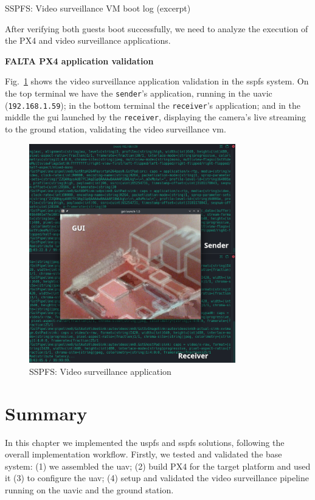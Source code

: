 \begin{longlisting}
\centering
\inputminted[]{kconfig}{./listing/sspfs-boot-cam.txt}
\caption{SSPFS: Video surveillance VM boot log (excerpt)}
\label{lst:sspfs-boot-cam}
\end{longlisting}

After verifying both guests boot successfully, we need to analyze the execution
of the PX4 and video surveillance applications.

\textbf{FALTA PX4 application validation}

Fig.~\ref{fig:sspfs-cam-qgc} shows the video surveillance application validation
in the \gls{sspfs} system. On the top terminal we have the \lstinline{sender}'s application,
running in the \gls{uavic} (\lstinline{192.168.1.59}); in the bottom terminal
the \lstinline{receiver}'s application; and in the middle the \gls{gui} launched
by the \lstinline{receiver}, displaying the camera's live streaming to the ground station, validating the
video surveillance \gls{vm}.

\begin{figure}
  \centering
  \includegraphics[width=0.8\textwidth]{./img/png/sspfs-cam-qgc} 
  \caption{SSPFS: Video surveillance application}%
  \label{fig:sspfs-cam-qgc}
\end{figure}


\section{Summary}
\label{sec:summary-implem}
In this chapter we implemented the \gls{uspfs} and \gls{sspfs}
solutions, following the overall implementation workflow. Firstly, we tested and
validated the base system: (1) we assembled the \gls{uav}; (2) build PX4 for
the target platform and used it (3) to configure the \gls{uav}; (4) setup and
validated the video surveillance pipeline running on the \gls{uavic} and the
ground station.

